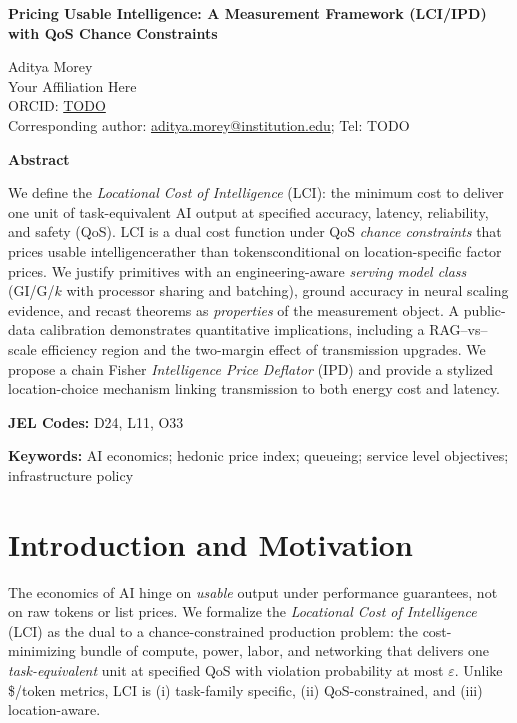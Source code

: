 ﻿\documentclass[12pt]{article}
\numberwithin{equation}{section}
\begin{document}
\begin{center}
{\LARGE \textbf{Pricing Usable Intelligence: A Measurement Framework (LCI/IPD) with QoS Chance Constraints}}

\vspace{0.6cm}
Aditya Morey
\\[2pt]
\small{Your Affiliation Here}
\\[4pt]
\small{ORCID: \href{https://orcid.org/TODO}{TODO}}
\\[4pt]
\small{Corresponding author: \href{mailto:aditya.morey@institution.edu}{aditya.morey@institution.edu}; Tel: TODO}
\\[6pt]
\end{center}

\noindent\textbf{Abstract}

\noindent We define the \emph{Locational Cost of Intelligence} (LCI): the minimum cost to deliver one unit of task-equivalent AI output at specified accuracy, latency, reliability, and safety (QoS). LCI is a dual cost function under QoS \emph{chance constraints} that prices usable intelligencerather than tokensconditional on location-specific factor prices. We justify primitives with an engineering-aware \emph{serving model class} (GI/G/$k$ with processor sharing and batching), ground accuracy in neural scaling evidence, and recast theorems as \emph{properties} of the measurement object. A public-data calibration demonstrates quantitative implications, including a RAG--vs--scale efficiency region and the two-margin effect of transmission upgrades. We propose a chain Fisher \emph{Intelligence Price Deflator} (IPD) and provide a stylized location-choice mechanism linking transmission to both energy cost and latency.

\vspace{0.2cm}
\noindent\textbf{JEL Codes:} D24, L11, O33

\vspace{0.2cm}
\noindent\textbf{Keywords:} AI economics; hedonic price index; queueing; service level objectives; infrastructure policy

\newpage

\section{Introduction and Motivation}
The economics of AI hinge on \emph{usable} output under performance guarantees, not on raw tokens or list prices. We formalize the \emph{Locational Cost of Intelligence} (LCI) as the dual to a chance-constrained production problem: the cost-minimizing bundle of compute, power, labor, and networking that delivers one \emph{task-equivalent} unit at specified QoS with violation probability at most $\varepsilon$. Unlike \$/token metrics, LCI is (i) task-family specific, (ii) QoS-constrained, and (iii) location-aware.
\end{document}
